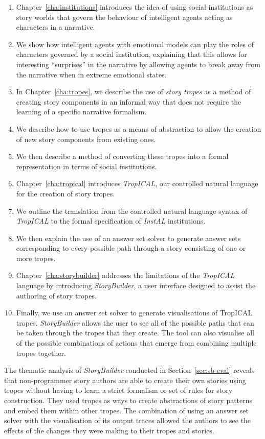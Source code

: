 \documentclass[11pt]{report}
\begin{document}
\begin{enumerate}
\item Chapter~\ref{cha:institutions} introduces the idea of using social
  institutions as story worlds that govern the behaviour of intelligent agents
  acting as characters in a narrative. 
\item We show how intelligent agents with emotional models can play the roles of
  characters governed by a social institution, explaining that this allows for
  interesting ``surprises'' in the narrative by allowing agents to break away
  from the narrative when in extreme emotional states.
\item In Chapter~\ref{cha:tropes}, we describe the use of \emph{story tropes} as a method of creating story components in
  an informal way that does not require the learning of a specific narrative formalism.
\item We describe how to use tropes as a means of abstraction to allow the creation of new
  story components from existing ones.
\item We then describe a method of converting these tropes into a formal
  representation in terms of social institutions.
\item Chapter~\ref{cha:tropical} introduces \emph{TropICAL}, our controlled natural
  language for the creation of story tropes.
\item We outline the translation from the controlled natural language syntax of
  \emph{TropICAL} to the formal specification of \emph{InstAL} institutions.
\item We then explain the use of an answer set solver to generate answer sets
  corresponding to every possible path through a story consisting of one or more tropes.
\item Chapter~\ref{cha:storybuilder} addresses the limitations of the
  \emph{TropICAL} language by introducing \emph{StoryBuilder}, a user interface
  designed to assist the authoring of story tropes.
\item Finally, we use an answer set solver to generate visualisations of TropICAL tropes.
  \emph{StoryBuilder} allows the user to see all of the possible paths
  that can be taken through the tropes that they create. The tool can also visualise
  all of the possible combinations of actions that emerge from combining multiple
  tropes together.
\end{enumerate}

The thematic analysis of \emph{StoryBuilder} conducted in Section~\ref{sec:sb-eval} reveals that
non-programmer story authors are able to create their own stories using tropes without having
to learn a strict formalism or set of rules for story construction. They used
tropes as ways to create abstractions of story patterns and embed them within
other tropes. The combination of using an answer set solver with the
visualisation of its output traces allowed the authors to see the effects of the
changes they were making to their tropes and stories.
\end{document}
